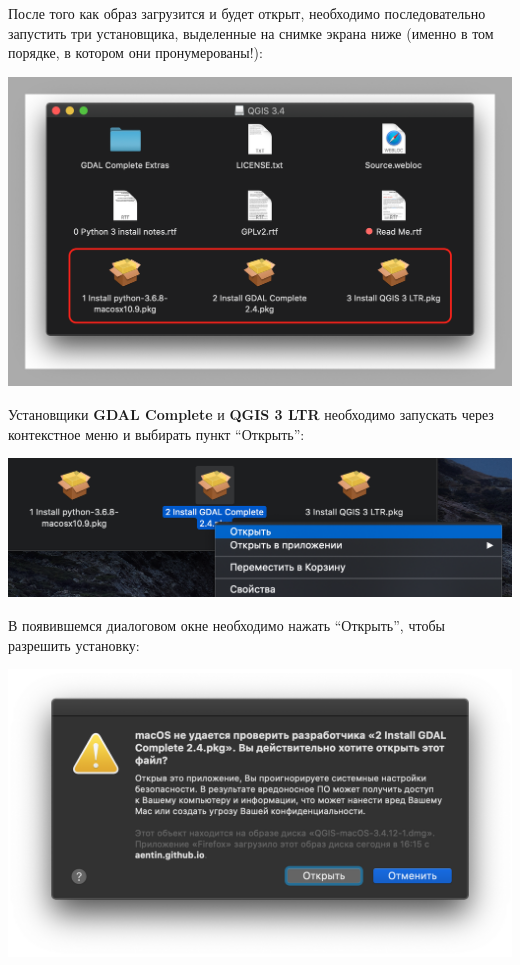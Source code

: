 \documentclass[
  12pt,
]{book}
\begin{document}
После того как образ загрузится и будет открыт, необходимо последовательно запустить три установщика, выделенные на снимке экрана ниже (именно в том порядке, в котором они пронумерованы!):

\includegraphics{images/installation_instruction_mac/mac02.png}

Установщики \textbf{GDAL Complete} и \textbf{QGIS 3 LTR} необходимо запускать через контекстное меню и выбирать пункт ``Открыть'':

\includegraphics{images/installation_instruction_mac/mac03.png}

В появившемся диалоговом окне необходимо нажать ``Открыть'', чтобы разрешить установку:

\includegraphics{images/installation_instruction_mac/mac04.png}
\end{document}
